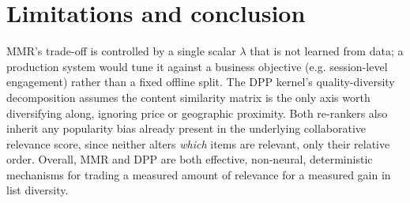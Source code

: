 \section{Limitations and conclusion}
MMR's trade-off is controlled by a single scalar $\lambda$ that is not
learned from data; a production system would tune it against a business
objective (e.g. session-level engagement) rather than a fixed offline
split. The DPP kernel's quality-diversity decomposition assumes the content
similarity matrix is the only axis worth diversifying along, ignoring
price or geographic proximity. Both re-rankers also inherit any popularity
bias already present in the underlying collaborative relevance score, since
neither alters \emph{which} items are relevant, only their relative order.
Overall, MMR and DPP are both effective, non-neural, deterministic
mechanisms for trading a measured amount of relevance for a measured gain
in list diversity.

